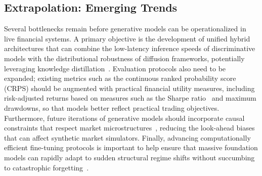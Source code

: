 \documentclass[11pt,a4paper]{article}
\begin{document}
\subsection{Extrapolation: Emerging Trends}
Several bottlenecks remain before generative models can be operationalized in live financial systems. A primary objective is the development of unified hybrid architectures that can combine the low-latency inference speeds of discriminative models with the distributional robustness of diffusion frameworks, potentially leveraging knowledge distillation~\citep{hinton2015distilling}. Evaluation protocols also need to be expanded; existing metrics such as the continuous ranked probability score (CRPS) should be augmented with practical financial utility measures, including risk-adjusted returns based on measures such as the Sharpe ratio~\citep{sharpe1994sharpe} and maximum drawdowns, so that models better reflect practical trading objectives. Furthermore, future iterations of generative models should incorporate causal constraints that respect market microstructures~\citep{ohara1995market,gould2013limit}, reducing the look-ahead biases that can affect synthetic market simulators. Finally, advancing computationally efficient fine-tuning protocols is important to help ensure that massive foundation models can rapidly adapt to sudden structural regime shifts without succumbing to catastrophic forgetting~\citep{mccloskey1989catastrophic,zenke2017continual}.
\end{document}
